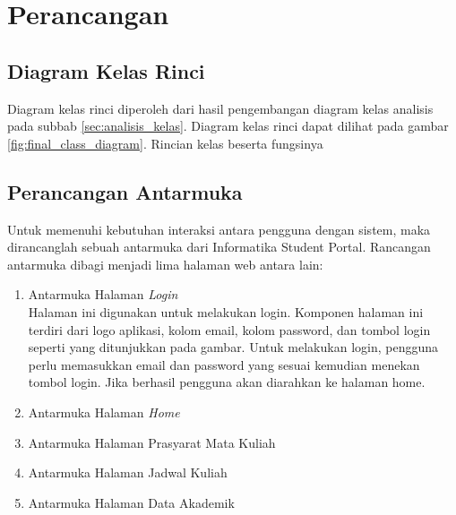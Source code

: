 \chapter{Perancangan}
\label{chap:perancangan}

\section{Diagram Kelas Rinci} 
\label{sec:diagram_kelas_rinci}
Diagram kelas rinci diperoleh dari hasil pengembangan diagram kelas analisis pada subbab \ref{sec:analisis_kelas}. Diagram kelas rinci dapat dilihat pada gambar \ref{fig:final_class_diagram}. Rincian kelas beserta fungsinya

\section{Perancangan Antarmuka}
\label{sec:perancangan_antarmuka}

Untuk memenuhi kebutuhan interaksi antara pengguna dengan sistem, maka dirancanglah sebuah antarmuka dari Informatika Student Portal. Rancangan antarmuka dibagi menjadi lima halaman web antara lain:

\begin{enumerate}
	\item {Antarmuka Halaman \textit{Login}}\\
	Halaman ini digunakan untuk melakukan login. Komponen halaman ini terdiri dari logo aplikasi, kolom email, kolom password, dan tombol login seperti yang ditunjukkan pada gambar. Untuk melakukan login, pengguna perlu memasukkan email dan password yang sesuai kemudian menekan tombol login. Jika berhasil pengguna akan diarahkan ke halaman home. 
	\item {Antarmuka Halaman \textit{Home}}\\
	\item {Antarmuka Halaman Prasyarat Mata Kuliah}\\
	\item {Antarmuka Halaman Jadwal Kuliah}\\
	\item {Antarmuka Halaman Data Akademik}\\
\end{enumerate}
